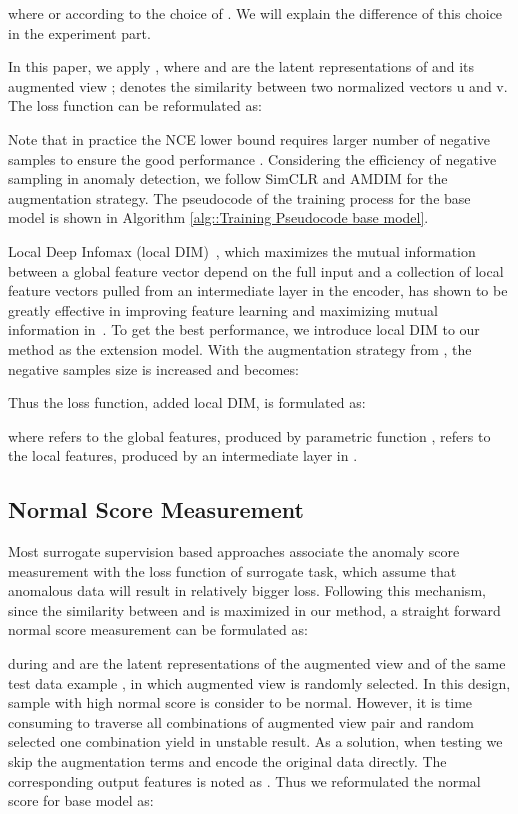 \documentclass[journal]{IEEEtran}
\theoremstyle{remark}
\begin{document}
where  or  according to the choice of . We will explain the difference of this choice in the experiment part.

In this paper, we apply , where  and  are the latent representations of  and its augmented view ;  denotes the similarity between two normalized vectors u and v.
The loss function can be reformulated as:


Note that in practice the NCE lower bound requires larger number of negative samples to ensure the good performance \cite{SimCLR,poole2019variational}. Considering the efficiency of negative sampling in anomaly detection, we follow SimCLR\cite{SimCLR} and AMDIM\cite{AMDIM} for the augmentation strategy.
The pseudocode of the training process for the base model is shown in Algorithm \ref{alg::Training Pseudocode base model}.


Local Deep Infomax (local DIM)~\cite{DIM}, which maximizes the mutual information between a global feature vector depend on the full input and a collection of local feature vectors pulled from an intermediate layer in the encoder, has shown to be greatly effective in improving feature learning and maximizing mutual information in~\cite{DIM,AMDIM}. 
To get the best performance, we introduce local DIM to our method as the extension model. With the augmentation strategy from \cite{SimCLR,AMDIM}, the negative samples size is increased and  becomes:


Thus the loss function, added local DIM, is formulated as:

where  refers to the global features, produced by parametric function ,  refers to the local features, produced by an intermediate layer in .

\subsection{Normal Score Measurement}
Most surrogate supervision based approaches associate the anomaly score measurement with the loss function of surrogate task, which  assume that anomalous data will result in relatively bigger loss. Following this mechanism, since the similarity between  and  is maximized in our method, a straight forward normal score measurement can be formulated as:

during  and  are the latent representations of the augmented view  and  of the same test data example , in which augmented view is randomly selected. In this design, sample with high normal score is consider to be normal. However, it is time consuming to traverse all combinations of augmented view pair and random selected one combination yield in unstable result. As a solution, when testing we skip the augmentation terms and encode the original data  directly. The corresponding output features is noted as . Thus we reformulated the normal score for base model as:
\end{document}
